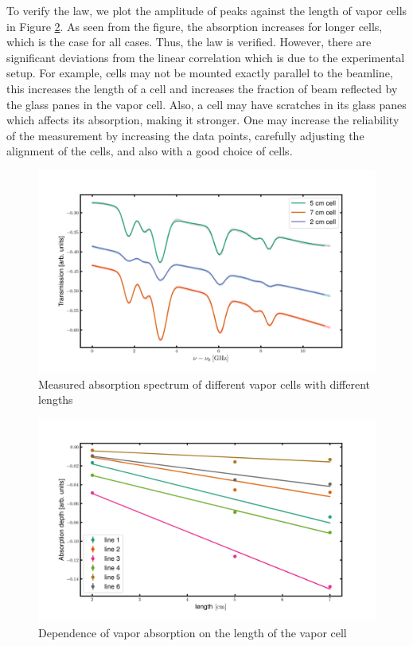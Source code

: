 \documentclass[12pt]{article}
\begin{document}
To verify the law, we plot the amplitude of peaks against the length of vapor cells in Figure \ref{fig11}. As seen from the figure, the absorption increases for longer cells, which is the case for all cases. Thus, the law is verified. However, there are significant deviations from the linear correlation which is due to the experimental setup. For example, cells may not be mounted exactly parallel to the beamline, this increases the length of a cell and increases the fraction of beam reflected by the glass panes in the vapor cell. Also, a cell may have scratches in its glass panes which affects its absorption, making it stronger.  
One may increase the reliability of the measurement by increasing the data points, carefully adjusting the alignment of the cells, and also with a good choice of cells. 
\begin{figure}[H]
    \centering
    \includegraphics[width = \textwidth]{fig/All_spectra.png}
    \caption{Measured absorption spectrum of different vapor cells with different lengths}
    \label{fig10}
\end{figure}


\begin{figure}[H]
    \centering
    \includegraphics[width = \textwidth]{fig/Lambeert_Beer.png}
    \caption{Dependence of vapor absorption on the length of the vapor cell}
    \label{fig11}
\end{figure}
\end{document}
